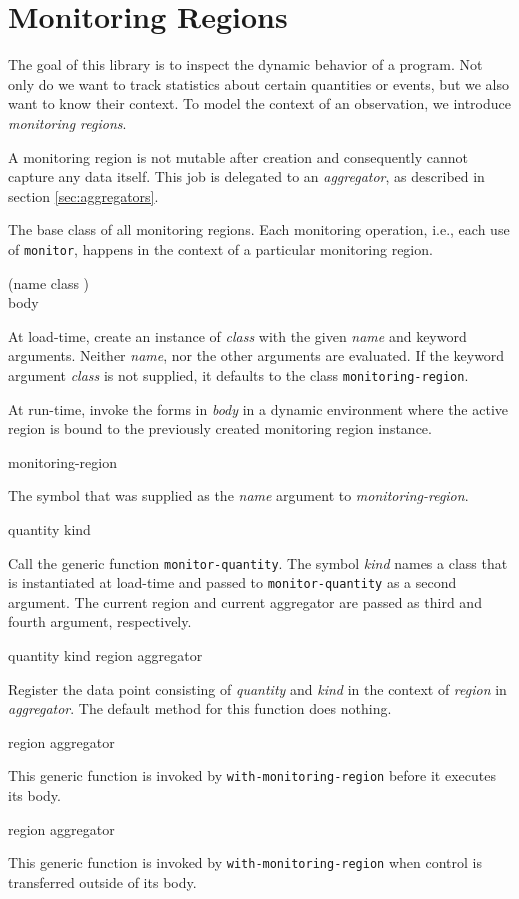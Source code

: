 \section{Monitoring Regions}
\label{sec:monitoring-regions}

The goal of this library is to inspect the dynamic behavior of a program.
Not only do we want to track statistics about certain quantities or events,
but we also want to know their context.  To model the context of an
observation, we introduce \emph{monitoring regions}.

A monitoring region is not mutable after creation and consequently cannot
capture any data itself.  This job is delegated to an \emph{aggregator}, as
described in section \ref{sec:aggregators}.


The base class of all monitoring regions.  Each monitoring operation, i.e.,
each use of \texttt{monitor}, happens in the context of a particular
monitoring region.

 {(name \key{}class \allow{}) \\ \body{} body}

At load-time, create an instance of \textit{class} with the given
\textit{name} and keyword arguments.  Neither \textit{name}, nor the other
arguments are evaluated.  If the keyword argument \textit{class} is not
supplied, it defaults to the class \texttt{monitoring-region}.

At run-time, invoke the forms in \textit{body} in a dynamic environment
where the active region is bound to the previously created monitoring
region instance.

 {monitoring-region}

The symbol that was supplied as the \textit{name} argument to
\textit{monitoring-region}.

 {quantity kind}

Call the generic function \texttt{monitor-quantity}.  The symbol
\textit{kind} names a class that is instantiated at load-time and passed to
\texttt{monitor-quantity} as a second argument.  The current region and
current aggregator are passed as third and fourth argument, respectively.

 {quantity kind region aggregator}

Register the data point consisting of \textit{quantity} and \textit{kind}
in the context of \textit{region} in \textit{aggregator}.  The default
method for this function does nothing.

 {region aggregator}

This generic function is invoked by \texttt{with-monitoring-region} before
it executes its body.

 {region aggregator}

This generic function is invoked by \texttt{with-monitoring-region}
when control is transferred outside of its body.